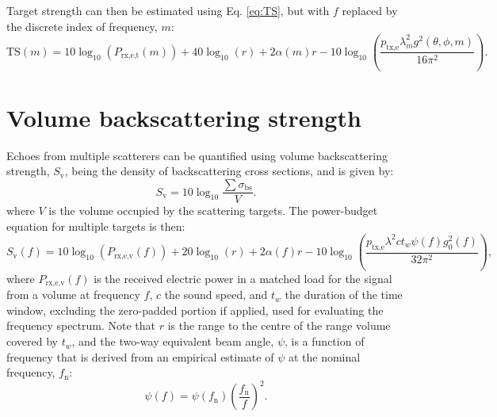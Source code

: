 \documentclass[preprint,12pt,TurnOnLineNumbers]{JASAnew}
\newcommand{\freqsym}{f}
\newcommand{\samplesymf}{m}
\newcommand{\fn}{f_{\textrm{n}}}
\newcommand{\ptxe}{p_{\textrm{tx,e}}}
\newcommand{\prxetf}{P_{\textrm{rx,e,t}}}
\newcommand{\prxevf}{P_{\textrm{rx,e,v}}}
\newcommand{\tslide}{t_w}
\newcommand{\bs}{\sigma_{\textrm{bs}}}
\newcommand{\ts}{\textrm{TS}}
\newcommand{\sv}{S_{\textrm{v}}}
\newcommand{\range}{r}
\newcommand{\athw}{\phi}
\newcommand{\along}{\theta}
\newcommand{\gain}{g}
\newcommand{\gainzero}{g_0}
\newcommand{\eqang}{\psi}
\newcommand{\wlen}{\lambda}
\newcommand{\cw}{c}
\newcommand{\absorp}{\alpha}
\begin{document}
Target strength can then be estimated using Eq. \ref{eq:TS}, but with $\freqsym$ replaced by the discrete index of frequency, $\samplesymf$:
\begin{equation}
\label{eq:TS_f}
\ts(\samplesymf) = 10\log_{10}(\prxetf(\samplesymf)) + 40\log_{10}(\range) + 2\absorp(\samplesymf)\range 
- 10\log_{10}\left( \frac{\ptxe \wlen_\samplesymf^2 \gain^2(\along,\athw,\samplesymf)}{16\pi^2} \right).
\end{equation}

\section{Volume backscattering strength}

Echoes from multiple scatterers can be quantified using volume backscattering strength, $\sv$, being the density of backscattering cross sections, and is given by:
%
\begin{equation}
\label{eq:sv}
\sv  =  10\log_{10}\frac{\sum\bs}{V}.
\end{equation}
%
where $V$ is the volume occupied by the scattering targets. The power-budget equation for multiple targets is then:
%
\begin{equation}
\label{eq:sv_f}
\sv(\freqsym) = 10\log_{10}(\prxevf(\freqsym)) + 20\log_{10}(\range) + 2\absorp(\freqsym)\range 
- 10\log_{10}\left( \frac{\ptxe \wlen^2 \cw \tslide \eqang(\freqsym) \gainzero^2(\freqsym)}{32\pi^2} \right), 
\end{equation}
%
where $\prxevf(\freqsym)$ is the received electric power in a matched load for the signal from a volume at frequency $\freqsym$, $\cw$ the sound speed, and $\tslide$ the duration of the time window, excluding the zero-padded portion if applied, used for evaluating the frequency spectrum. Note that $\range$ is the range to the centre of the range volume covered by $\tslide$, and the two-way equivalent beam angle, $\eqang$, is a function of frequency that is derived from an empirical estimate of $\eqang$ at the nominal frequency, $\fn$:
\begin{equation}
\label{eq:PsiFc}
\eqang(f) = \eqang(\fn)\left(\frac{\fn}{f}\right)^2.
\end{equation}
\end{document}
